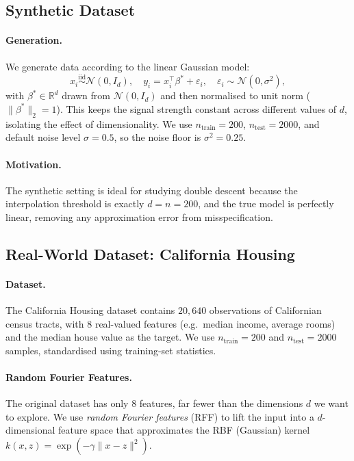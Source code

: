 \documentclass[11pt,a4paper]{article}
\begin{document}
\subsection{Synthetic Dataset}

\paragraph{Generation.}
We generate data according to the linear Gaussian model:
\[
  x_i \overset{\mathrm{iid}}{\sim} \mathcal{N}(0, I_d),\quad
  y_i = x_i^\top \beta^* + \varepsilon_i, \quad \varepsilon_i \sim \mathcal{N}(0, \sigma^2),
\]
with $\beta^* \in \mathbb{R}^d$ drawn from $\mathcal{N}(0, I_d)$ and then normalised to unit
norm ($\|\beta^*\|_2 = 1$).
This keeps the signal strength constant across different values of $d$, isolating the effect of
dimensionality.
We use $n_{\mathrm{train}} = 200$, $n_{\mathrm{test}} = 2000$, and default noise level
$\sigma = 0.5$, so the noise floor is $\sigma^2 = 0.25$.

\paragraph{Motivation.}
The synthetic setting is ideal for studying double descent because the interpolation threshold is
exactly $d = n = 200$, and the true model is perfectly linear, removing any approximation error
from misspecification.

\subsection{Real-World Dataset: California Housing}

\paragraph{Dataset.}
The California Housing dataset \cite{pace1997sparse} contains $20{,}640$ observations of
Californian census tracts, with 8 real-valued features (e.g.\ median income, average rooms)
and the median house value as the target.
We use $n_{\mathrm{train}} = 200$ and $n_{\mathrm{test}} = 2000$ samples, standardised using
training-set statistics.

\paragraph{Random Fourier Features.}
The original dataset has only 8 features, far fewer than the dimensions $d$ we want to explore.
We use \emph{random Fourier features} (RFF) \cite{rahimi2007random} to lift the input into a
$d$-dimensional feature space that approximates the RBF (Gaussian) kernel
$k(x, z) = \exp(-\gamma\|x - z\|^2)$.
\end{document}
